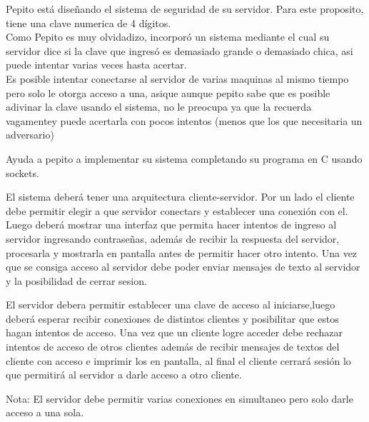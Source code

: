 \documentclass{article}
\begin{document}
Pepito está diseñando el sistema de seguridad de su servidor. Para este
proposito, tiene una clave numerica de 4 dígitos.\\

Como Pepito es muy olvidadizo, incorporó un sistema mediante el cual su
servidor dice si la clave que ingresó es demasiado grande o demasiado chica,
asi puede intentar varias veces hasta acertar.\\

Es posible intentar conectarse al servidor de varias maquinas al mismo tiempo
pero solo le otorga acceso a una, asique aunque pepito sabe que es posible
adivinar la clave usando el sistema, no le preocupa ya que la recuerda 
vagamentey puede acertarla con pocos intentos (menos que los que necesitaria
un adversario)

Ayuda a pepito a implementar su sistema completando su programa en C usando sockets.

El sistema deberá tener una arquitectura cliente-servidor. Por un lado el cliente debe permitir 
elegir a que servidor conectars y establecer una conexión con el. Luego deberá mostrar una interfaz 
que permita hacer intentos de ingreso al servidor ingresando contraseñas, además de recibir la respuesta
del servidor, procesarla y mostrarla en pantalla antes de permitir hacer otro intento. Una vez que se 
consiga acceso al servidor debe poder enviar mensajes de texto al servidor y la posibilidad de cerrar sesion. 

El servidor debera permitir establecer una clave de acceso al iniciarse,luego deberá esperar recibir conexiones 
de distintos clientes y posibilitar que estos hagan intentos de acceso. Una vez que un cliente logre acceder debe 
rechazar intentos de acceso de otros clientes además de recibir mensajes de textos del cliente con acceso e imprimir los
en pantalla, al final el cliente cerrará sesión lo que permitirá al servidor a darle acceso a otro cliente.

Nota: El servidor debe permitir varias conexiones en simultaneo pero solo darle acceso a una sola.
\end{document}

